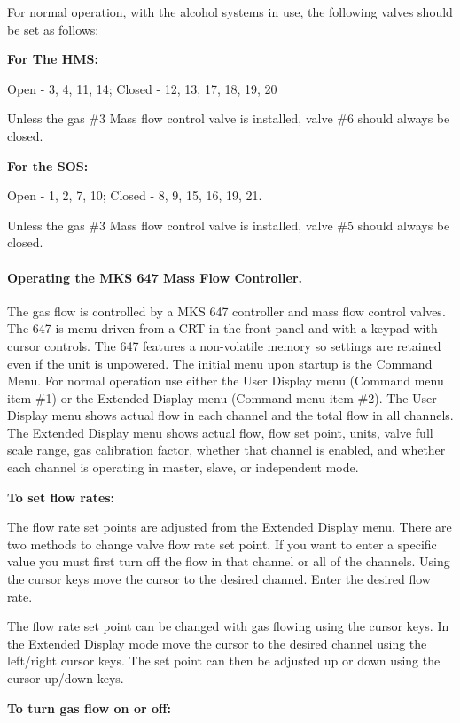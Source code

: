 For normal operation, with the alcohol systems in use, the following valves
should be set as follows:

{\bf For The HMS:}

Open - 3, 4, 11, 14; Closed - 12, 13, 17, 18, 19, 20


Unless the gas \#3 Mass flow control valve is installed, valve \#6 should
always be closed.

{\bf For the SOS:}

Open - 1, 2, 7, 10; Closed - 8, 9, 15, 16, 19, 21.


Unless the gas \#3 Mass flow  control valve is installed, valve \#5 should
always be closed.

\paragraph{Operating the MKS 647 Mass Flow Controller.}

The gas flow is controlled by a MKS 647 controller and mass flow
control valves.  The 647 is menu driven from a CRT in the front panel and
with a keypad with cursor controls. The 647 features a non-volatile memory
so settings are retained even if the unit is unpowered.  The initial menu
upon startup is the Command Menu.  For normal operation use either the User
Display menu (Command menu item \#1) or the Extended Display menu (Command
menu item \#2).  The User Display menu shows actual flow in each channel and
the total flow in all channels.  The Extended Display menu shows actual
flow, flow set point, units, valve full scale range, gas calibration
factor, whether that channel is enabled, and whether each channel is
operating in master, slave, or independent mode.

{\bf To set flow rates:}

The flow rate set points are adjusted from the Extended Display
menu.  There are two methods to change valve flow rate set point.  If you
want to enter a specific value you must first turn off the flow in that
channel or all of the channels.  Using the cursor keys move the cursor to
the desired channel.  Enter the desired flow rate.

The flow rate set point can be changed with gas flowing using the
cursor keys. In the Extended Display mode move the cursor to the desired
channel using the left/right cursor keys.  The set point can then be
adjusted up or down using the cursor up/down keys.

{\bf To turn gas flow on or off:}


